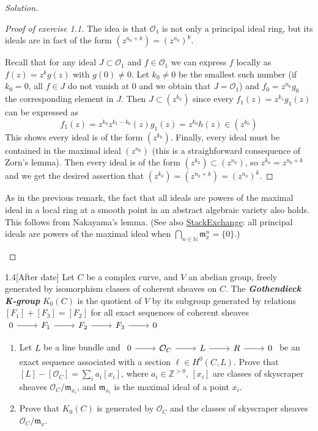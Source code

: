 \begin{proof}[Solution]
\begin{proof}[Proof of exercise 1.1]
The idea is that $\mathcal{O}_1$ is not only a principal ideal ring, but its ideals are in fact of the form $(z^{n_0+k})=(z^{n_0})^k$.

Recall that for any ideal  $J \subset \mathcal{O}_1$ and $f\in\mathcal{O}_1$ we can express $f$ locally as $f(z)=z^kg(z)$ with $g(0)\neq 0$. Let $k_0\neq 0$ be the smallest such number (if $k_0=0$, all $f\in J$ do not vanish at $0$ and we obtain that $J=\mathcal{O}_1$) and $f_0=z^{n_0}g_0$ the corresponding element in $J$. Then $J \subset (z^{k_0})$ since every $f_1(z)=z^{k_1}g_1(z)$ can be expressed as 
\[f_1(z)=z^{k_0}z^{k_1-k_0}(z)g_1(z)=z^{k_0}h(z)\in(z^{k_0})\]
This shows every ideal is of the form $(z^{k_0})$. Finally, every ideal must be contained in the maximal ideal $(z^{n_0})$ (this is a straighforward consequence of Zorn's lemma). Then every ideal is of the form $(z^{k_0})\subset(z^{n_0})$, so $z^{k_0}=z^{n_0+k}$ and we get the desired assertion that $(z^{k_0})=(z^{n_0+k})=(z^{n_0})^k$.
	\end{proof}

	\begin{remark}[by Altan]\leavevmode
	As in the previous remark, the fact that all ideals are powers of the maximal ideal in a local ring at a smooth point in an abstract algebraic variety also holds. This follows from Nakayama's lemma. (See also \href{https://math.stackexchange.com/questions/704613/local-ring-with-principal-maximal-ideal}{StackExchange}: all principal ideals are powers of the maximal ideal when  $ \bigcap_{n \in \mathbb{N}} \mathfrak{m}_x^n=\{0\}$.)
\end{remark}
\end{proof}

\begin{manualexercise}{1.4}[After date]
	Let $C$ be a complex curve, and $V$ an abelian group, freely generated by isomorphism classes of coherent sheaves on $C$. The \textit{\textbf{Gothendieck K-group}} $K_0(C)$ is the quotient of $V$ by its subgroup generated by relations $[F_1]+[F_3]=[F_2]$ for all exact sequences of coherent sheaves $\begin{tikzcd}
		0\arrow[r]&F_1\arrow[r]&F_2\arrow[r]&F_3\arrow[r]&0
	\end{tikzcd}$
	\begin{enumerate}[label=\alph*.]
		\item Let $L$ be a line bundle and $\begin{tikzcd}
			0\arrow[r]&\mathcal{O}_C\arrow[r]&L\arrow[r]&R\arrow[r]&0
		\end{tikzcd}$ be an exact sequence associated with a section $\ell \in H^{0}(C,L)$. Prove that $[L]-[\mathcal{O}_C]=\sum_{i}a_i[x_i]$, where $a_i\in\mathbb{Z}^{>0}$, $[x_i]$ are classes of skyscraper sheaves $\mathcal{O}_C/\mathfrak{m}_{x_i}$, and $\mathfrak{m}_{x_i}$ is the maximal ideal of a point $x_i$.
	
	\item Prove that $K_0(C)$ is generated by $\mathcal{O}_C$ and the classes of skyscraper sheaves $\mathcal{O}_C/\mathfrak{m}_{x}$.
	\end{enumerate}
\end{manualexercise}


